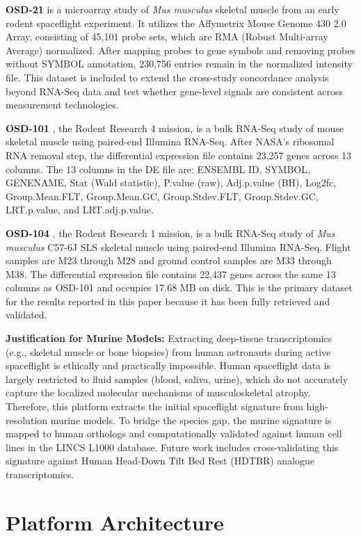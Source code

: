 \documentclass[conference]{IEEEtran}
\begin{document}
\textbf{OSD-21} \cite{osd21} is a microarray study of \textit{Mus musculus} skeletal muscle from an early rodent spaceflight experiment. It utilizes the Affymetrix Mouse Genome 430 2.0 Array, consisting of 45,101 probe sets, which are RMA (Robust Multi-array Average) normalized. After mapping probes to gene symbols and removing probes without SYMBOL annotation, 230,756 entries remain in the normalized intensity file. This dataset is included to extend the cross-study concordance analysis beyond RNA-Seq data and test whether gene-level signals are consistent across measurement technologies.

\textbf{OSD-101} \cite{osd101}, the Rodent Research 4 mission, is a bulk RNA-Seq study of mouse skeletal muscle using paired-end Illumina RNA-Seq. After NASA's ribosomal RNA removal step, the differential expression file contains 23,257 genes across 13 columns. The 13 columns in the DE file are: ENSEMBL ID, SYMBOL, GENENAME, Stat (Wald statistic), P.value (raw), Adj.p.value (BH), Log2fc, Group.Mean.FLT, Group.Mean.GC, Group.Stdev.FLT, Group.Stdev.GC, LRT.p.value, and LRT.adj.p.value.

\textbf{OSD-104} \cite{osd104}, the Rodent Research 1 mission, is a bulk RNA-Seq study of \textit{Mus musculus} C57-6J SLS skeletal muscle using paired-end Illumina RNA-Seq. Flight samples are M23 through M28 and ground control samples are M33 through M38. The differential expression file contains 22,437 genes across the same 13 columns as OSD-101 and occupies 17.68 MB on disk. This is the primary dataset for the results reported in this paper because it has been fully retrieved and validated.

\textbf{Justification for Murine Models:} Extracting deep-tissue transcriptomics (e.g., skeletal muscle or bone biopsies) from human astronauts during active spaceflight is ethically and practically impossible. Human spaceflight data is largely restricted to fluid samples (blood, saliva, urine), which do not accurately capture the localized molecular mechanisms of musculoskeletal atrophy. Therefore, this platform extracts the initial spaceflight signature from high-resolution murine models. To bridge the species gap, the murine signature is mapped to human orthologs and computationally validated against human cell lines in the LINCS L1000 database. Future work includes cross-validating this signature against Human Head-Down Tilt Bed Rest (HDTBR) analogue transcriptomics.

\section{Platform Architecture}
\end{document}

